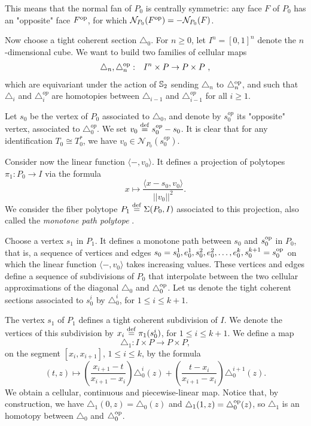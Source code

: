 This means that the normal fan of $P_0$ is centrally symmetric: any face $F$ of $P_0$ has an "opposite" face $F^{\op}$, for which $\mathcal{N}_{P_0}(F^{\op})=-\mathcal{N}_{P_0}(F)$.

Now choose a tight coherent section $\triangle_0$.
For $n\geq 0$, let $I^n=[0,1]^n$ denote the $n$-dimensional cube.
We want to build two families of cellular maps
\begin{eqnarray*}
\triangle_n, \triangle^{\op}_n & : & I^n \times P \to P\times P  \ ,
\end{eqnarray*}
which are equivariant under the action of $\S_2$ sending $\triangle_n$ to $\triangle^{\op}_n$, and such that $\triangle_i$ and $\triangle_i^{op}$ are homotopies between $\triangle_{i-1}$ and $\triangle_{i-1}^{op}$ for all $i \geq 1$.

Let $s_0$ be the vertex of $P_0$ associated to $\triangle_0$, and denote by $s_0^{op}$ its "opposite" vertex, associated to $\triangle_0^{op}$. We set $v_0 \defeq s_0^{op}-s_0$. It is clear that for any identification $T_0 \cong T_0^{*}$, we have $v_0 \in \mathcal{N}_{P_0}(s_0^{op})$. 

Consider now the linear function $\langle - , v_0 \rangle$.
It defines a projection of polytopes $\pi_1 \colon P_0 \to I$ via the formula
\[
x \mapsto \frac{\langle x-s_0, v_0 \rangle}{||v_0||^2}.
\]
We consider the fiber polytope $P_1 \defeq \Sigma(P_0,I)$ associated to this projection, also called the \emph{monotone path polytope} \cite[Chapter 9]{Ziegler95}.

Choose a vertex $s_1$ in $P_1$.
It defines a monotone path between $s_0$ and $s^{\op}_0$ in $P_0$, that is, a sequence of vertices and edges $s_0 = s_0^1, e_0^1, s_0^2, e_0^2, \dots, e_0^k, s_0^{k+1} = s^{\op}_0$ on which the linear function $\langle - , v_0 \rangle$ takes increasing values.
These vertices and edges define a sequence of subdivisions of $P_0$ that interpolate between the two cellular approximations of the diagonal $\triangle_0$ and $\triangle^{\op}_0$.
Let us denote the tight coherent sections associated to $s_0^i$ by $\triangle_0^i$, for $1 \leq i \leq k+1$.

The vertex $s_1$ of $P_1$ defines a tight coherent subdivision of $I$.
We denote the vertices of this subdivision by $x_i \defeq \pi_1(s_0^i)$, for $1 \leq i \leq k+1$.
We define a map
\[
\triangle_1 \colon I \times P \to P \times P,
\]
on the segment $[x_i, x_{i+1}]$, $1 \leq i \leq k$, by the formula
\[
(t,z) \mapsto \left( \frac{x_{i+1}-t}{x_{i+1}-x_i} \right) \triangle_0^{i}(z) + \left( \frac{t-x_{i}}{x_{i+1}-x_i} \right) \triangle_0^{i+1}(z).
\]
We obtain a cellular, continuous and piecewise-linear map.
Notice that, by construction, we have $\triangle_1(0,z)=\triangle_0(z)$ and $\triangle_1(1,z)=\triangle_0^{\op}(z)$, so $\triangle_1$ is an homotopy between $\triangle_0$ and $\triangle_0^{\op}$.

